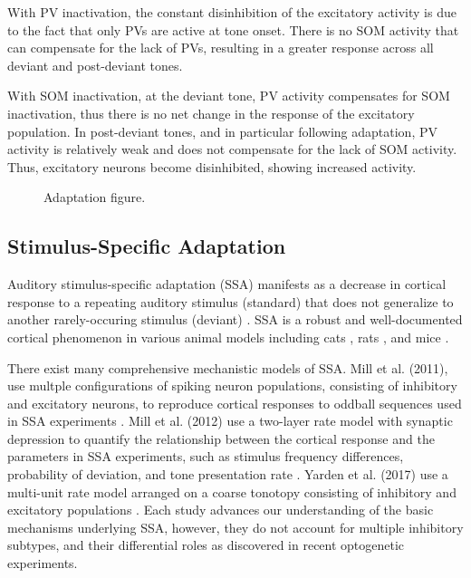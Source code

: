 \documentclass[a4paper,10pt]{article}
\begin{document}
With PV inactivation, the constant disinhibition of the excitatory activity is due to the fact that only PVs are active at tone onset. There is no SOM activity that can compensate for the lack of PVs, resulting in a greater response across all deviant and post-deviant tones.

With SOM inactivation, at the deviant tone, PV activity compensates for SOM inactivation, thus there is no net change in the response of the excitatory population. In post-deviant tones, and in particular following adaptation, PV activity is relatively weak and does not compensate for the lack of SOM activity. Thus, excitatory neurons become disinhibited, showing increased activity.


\begin{figure}
\caption{Adaptation figure.}\label{fig:adaptation}
\end{figure}


\subsection{Stimulus-Specific Adaptation}\label{sec:ssa}



Auditory stimulus-specific adaptation (SSA) manifests as a decrease in cortical response to a repeating auditory stimulus (standard) that does not generalize to another rarely-occuring stimulus (deviant) \cite{yarden2017stimulus}. SSA is a robust and well-documented cortical phenomenon in various animal models including cats \cite{ulanovsky2003processing}, rats \cite{von2009correlating}, and mice \cite{natan2015complementary,natan2017cortical}.

There exist many comprehensive mechanistic models of SSA. Mill et al. (2011), use multple configurations of spiking neuron populations, consisting of inhibitory and excitatory neurons, to reproduce cortical responses to oddball sequences used in SSA experiments \cite{mill2011neurocomputational}. Mill et al. (2012) use a two-layer rate model with synaptic depression to quantify the relationship between the cortical response and the parameters in SSA experiments, such as stimulus frequency differences, probability of deviation, and tone presentation rate \cite{mill2012characterising}. Yarden et al. (2017) use a multi-unit rate model arranged on a coarse tonotopy consisting of inhibitory and excitatory populations \cite{yarden2017stimulus}. Each study advances our understanding of the basic mechanisms underlying SSA, however, they do not account for multiple inhibitory subtypes, and their differential roles as discovered in recent optogenetic experiments. 
\end{document}
